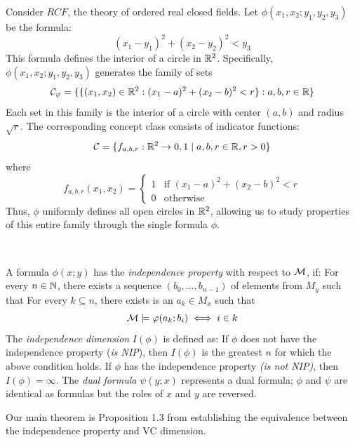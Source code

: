 \begin{example}
\label{example:circle}
\begin{outline}
\0 Consider $RCF$, the theory of ordered real closed fields. Let $\phi(x_1,x_2;y_1,y_2,y_3)$ be the formula:
    $$(x_1-y_1)^2+(x_2-y_2)^2 < y_3$$
\0 This formula defines the interior of a circle in $\mathbb{R}^2$. Specifically, $\phi(x_1,x_2;y_1,y_2,y_3)$ generates the family of sets 
$$\mathcal{C}_\varphi = \{\{(x_1,x_2) \in \mathbb{R}^2 : (x_1-a)^2+(x_2-b)^2 < r\} : a,b,r \in \mathbb{R}\}$$
Each set in this family is the interior of a circle with center $(a,b)$ and radius $\sqrt{r}$.
The corresponding concept class consists of indicator functions:
$$\mathcal{C} = \{f_{a,b,r} : \mathbb{R}^2 \to {0,1} \mid a,b,r \in \mathbb{R}, r > 0\}$$
where
$$f_{a,b,r}(x_1,x_2) = \begin{cases}
1 & \text{if } (x_1-a)^2+(x_2-b)^2 < r \\
0 & \text{otherwise}
\end{cases}$$
Thus, $\phi$ uniformly defines all open circles in $\mathbb{R}^2$, allowing us to study properties of this entire family through the single formula $\phi$.
\end{outline}
\end{example}

\begin{definition}
    \label{def:indFormula}
    ~
    \begin{outline}
    \1 A formula $\phi(x;y)$ has the \emph{independence property} with respect to $\mathcal{M}$, if:
        \2 For every $n\in\mathbb{N}$, there exists a sequence $(b_0,\ldots,b_{n-1})$ of elements from $M_y$ such that
        \2 For every $k\subseteq n$, there exists is an $a_k\in M_x$ such that 
        $$\mathcal{M}\models \varphi(a_k; b_i) \iff i\in k$$ 
    \1 The \emph{independence dimension} $I(\phi)$ is defined as:
        \2 If $\phi$ does not have the independence property (\emph{is NIP}), then $I(\phi)$ is the greatest $n$ for which the above condition holds. 
        \2 If $\phi$ has the independence property \emph{(is not NIP)}, then $I(\phi)=\infty$.
    \1 The \emph{dual formula} $\psi(y;x)$ represents a dual formula; $\phi$ and $\psi$ are identical as formulas but the roles of $x$ and $y$ are reversed.
    \end{outline}
\end{definition}

Our main theorem is Proposition 1.3 from \cite{Laskowski1992} establishing the equivalence between the independence property and VC dimension. 

